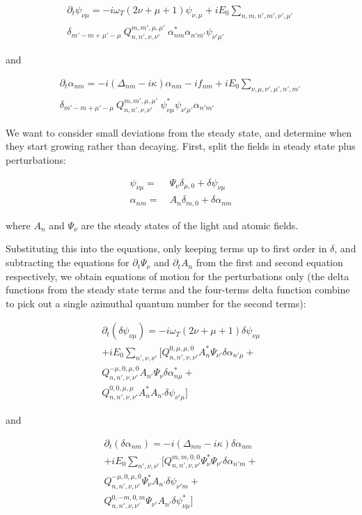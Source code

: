 \documentclass[a4paper,twocolumn,nobalancelastpage]{revtex4-1}
\newcommand{\af}{\psi_{\nu\mu}}
\newcommand{\lf}{\alpha_{nm}}
\newcommand{\lfp}{\alpha_{n'm'}}
\begin{document}
\begin{multline}
\partial_t \psi_{\nu \mu} = -i\omega_T (2\nu+\mu+1) \psi_{\nu, \mu}
+i E_0 \sum_{n,m,n',m', \nu', \mu'} \\
\delta_{m'-m+\mu'-\mu} \ Q^{m,m',\mu,\mu'}_{n,n',\nu,\nu'} \ \lf^* \lfp  \psi_{\nu'\mu'} 
\end{multline}

and

\begin{multline}
\partial_t \alpha_{nm}= -i(\Delta_{nm}-i\kappa) \alpha_{nm}-if_{nm} +i E_0 \sum_{\nu, \mu,\nu', \mu',n',m'} \\ \delta_{m'-m+\mu'-\mu} \ 
Q^{m,m',\mu,\mu'}_{n,n',\nu,\nu'} \ \psi_{\nu\mu}^* \psi_{\nu'\mu'}  \alpha_{n'm'} 
\end{multline}

We want to consider small deviations from the steady state, and determine when they start growing rather than decaying.
First, split the fields in steady state plus perturbations:

\begin{align}
\af=& \ \Psi_{\nu} \delta_{\mu,0} + \delta \af \\
\lf=& \ A_{n} \delta_{m,0} + \delta \lf
\end{align}

where $A_n$ and $\Psi_{\nu}$ are the steady states of the light and atomic fields.

Substituting this into the equations, only keeping terms up to first order in $\delta$, and subtracting the equations for $\partial_t \Psi_{\nu}$ and $\partial_t A_n$ from the first and second equation respectively, we obtain equations of motion for the perturbations only (the delta functions from the steady state terms and the four-terms delta function combine to pick out a single azimuthal quantum number for the second terms):

\begin{multline}
\partial_t (\delta \af) = -i\omega_T (2\nu+\mu+1) \delta \af\\ +i E_0  \sum_{n',\nu, \nu'} \bigg[ 
Q^{0,\mu,\mu,0}_{n,n',\nu,\nu'}  A^*_n \Psi_{\nu'} \delta \alpha_{n'\mu} + \\
Q^{-\mu,0,\mu,0}_{n,n',\nu,\nu'}  A_{n'} \Psi_{\nu} \delta \alpha^*_{n\mu} + \\
Q^{0,0,\mu,\mu}_{n,n',\nu,\nu'}  A^*_{n} A_{n'} \delta \psi_{\nu' \mu} \bigg]
\end{multline}

and

\begin{multline}
\partial_t (\delta \lf) = -i(\Delta_{nm}-i\kappa) \delta \lf\\ +i E_0  \sum_{n',\nu, \nu'} \bigg[ 
Q^{m,m,0,0}_{n,n',\nu,\nu'}  \Psi^*_{\nu} \Psi_{\nu'} \delta \alpha_{n'm} + \\
Q^{-\mu,0,\mu,0}_{n,n',\nu,\nu'}  \Psi^*_{\nu} A_{n'}  \delta \psi_{\nu' m} + \\
Q^{0,-m,0,m}_{n,n',\nu,\nu'}  \Psi_{\nu'} A_{n'} \delta \psi^*_{\nu \mu} \bigg]
\end{multline}
\end{document}
